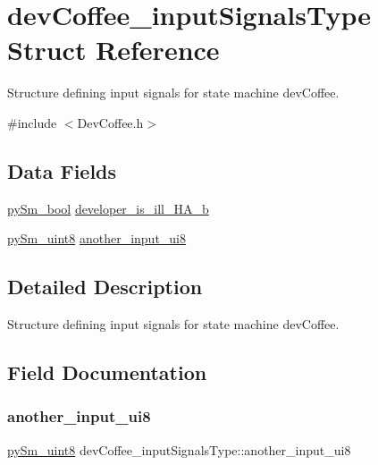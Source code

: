 \hypertarget{structdevCoffee__inputSignalsType}{}\section{dev\+Coffee\+\_\+input\+Signals\+Type Struct Reference}
\label{structdevCoffee__inputSignalsType}


Structure defining input signals for state machine dev\+Coffee.  




{\ttfamily \#include $<$Dev\+Coffee.\+h$>$}

\subsection*{Data Fields}
\begin{DoxyCompactItemize}
\item 
\hyperlink{PySm__types_8h_a368133d64634d66410f3fe1343de6ba3}{py\+Sm\+\_\+bool} \hyperlink{structdevCoffee__inputSignalsType_ab9063470d37a4246a62bc5437fc8c283}{developer\+\_\+is\+\_\+ill\+\_\+\+H\+A\+\_\+b}
\item 
\hyperlink{PySm__types_8h_a1aff40256c00f194609879f8f6f1e1a1}{py\+Sm\+\_\+uint8} \hyperlink{structdevCoffee__inputSignalsType_a469bf8cac43daac6efb9d51e5f2d9e40}{another\+\_\+input\+\_\+ui8}
\end{DoxyCompactItemize}


\subsection{Detailed Description}
Structure defining input signals for state machine dev\+Coffee. 

\subsection{Field Documentation}
\mbox{\label{structdevCoffee__inputSignalsType_a469bf8cac43daac6efb9d51e5f2d9e40}} 
\subsubsection{\texorpdfstring{another\+\_\+input\+\_\+ui8}{another\_input\_ui8}}
{\footnotesize\ttfamily \hyperlink{PySm__types_8h_a1aff40256c00f194609879f8f6f1e1a1}{py\+Sm\+\_\+uint8} dev\+Coffee\+\_\+input\+Signals\+Type\+::another\+\_\+input\+\_\+ui8}

